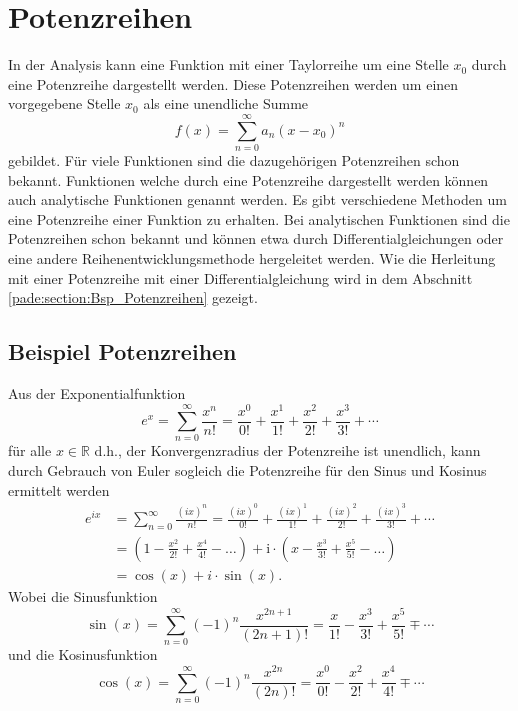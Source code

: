 %
%
%
\section{Potenzreihen
\label{pade:section:Potenzreihen}}
In der Analysis kann eine Funktion mit einer Taylorreihe um eine Stelle $x_{0}$ durch eine Potenzreihe dargestellt werden. 
Diese Potenzreihen werden um einen vorgegebene Stelle $x_{0}$ als eine unendliche Summe 
\begin{equation}
f(x)=\sum_{n=0}^{\infty} a_{n} (x-x_{0})^{n} 
\end{equation}
gebildet.
Für viele Funktionen sind die dazugehörigen Potenzreihen schon bekannt. 
Funktionen welche durch eine Potenzreihe dargestellt werden können auch analytische Funktionen genannt werden.
Es gibt verschiedene Methoden um eine Potenzreihe einer Funktion zu erhalten. 
Bei analytischen Funktionen sind die Potenzreihen schon bekannt und können etwa durch Differentialgleichungen oder eine andere Reihenentwicklungsmethode hergeleitet werden.
Wie die Herleitung mit einer Potenzreihe mit einer Differentialgleichung wird in dem Abschnitt \ref{pade:section:Bsp_Potenzreihen} gezeigt.

\subsection{Beispiel Potenzreihen
\label{pade:section:Bsp_Potenzreihen}}
Aus der Exponentialfunktion
\begin{equation*}
e^{x}
=
\sum_{n=0}^{\infty} \frac{x^{n}}{n !}
=
\frac{x^{0}}{0 !}+\frac{x^{1}}{1 !}+\frac{x^{2}}{2 !}+\frac{x^{3}}{3 !}+\cdots 
\end{equation*}
für alle $x \in \mathbb{R}$ d.h., der Konvergenzradius der Potenzreihe ist unendlich, kann durch Gebrauch von Euler sogleich die Potenzreihe für den Sinus und Kosinus ermittelt werden
\begin{align*}
e^{ix}
&=
\sum_{n=0}^{\infty} \frac{(ix)^{n}}{n !}
=
\frac{(ix)^{0}}{0 !}+\frac{(ix)^{1}}{1 !}+\frac{(ix)^{2}}{2 !}+\frac{(ix)^{3}}{3 !}+\cdots
\\
&=
\left(1-\frac{x^{2}}{2 !}+\frac{x^{4}}{4 !}-\ldots\right)+\mathrm{i} \cdot\left(x-\frac{x^{3}}{3 !}+\frac{x^{5}}{5 !}-\ldots\right)
\\
&=
\cos(x)+i\cdot \sin(x).
\end{align*}
Wobei die Sinusfunktion 
\begin{equation*}
\sin (x)=\sum_{n=0}^{\infty}(-1)^{n} \frac{x^{2 n+1}}{(2 n+1) !}=\frac{x}{1 !}-\frac{x^{3}}{3 !}+\frac{x^{5}}{5 !} \mp \cdots
\end{equation*}
und die Kosinusfunktion 
\begin{equation*}
\cos (x)=\sum_{n=0}^{\infty}(-1)^{n} \frac{x^{2 n}}{(2 n) !}=\frac{x^{0}}{0 !}-\frac{x^{2}}{2 !}+\frac{x^{4}}{4 !} \mp \cdots
\end{equation*}



